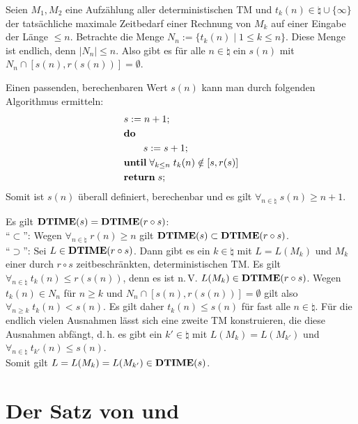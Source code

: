 \begin{Beweis}
    Seien $M_1, M_2$ eine Aufzählung aller deterministischen TM und
    $t_k(n) \in \natural \cup \{\infty\}$ der tatsächliche maximale Zeitbedarf einer Rechnung
    von $M_k$ auf einer Eingabe der Länge $\le n$.
    Betrachte die Menge $N_n := \{t_k(n) \;|\; 1 \le k \le n\}$.
    Diese Menge ist endlich, denn $|N_n| \le n$.
    Also gibt es für alle $n \in \natural$ ein $s(n)$ mit
    $N_n \cap [s(n), r(s(n))] = \emptyset$.

    Einen passenden, berechenbaren Wert $s(n)$ kann man durch folgenden Algorithmus ermitteln:
    \begin{align*}&
        s := n + 1;\\&
        \mathbf{do}\;\\&
        \qquad s := s + 1;\\&
        \mathbf{until}\; \forall_{k \le n}\; t_k(n) \notin [s, r(s)]\\&
        \mathbf{return}\; s;
    \end{align*}
    Somit ist $s(n)$ überall definiert, berechenbar und es gilt
    $\forall_{n \in \natural}\; s(n) \ge n + 1$.

    Es gilt $\mathbf{DTIME}(s) = \mathbf{DTIME}(r \circ s)$:\\
    "`$\subset$"':
    Wegen $\forall_{n \in \natural}\; r(n) \ge n$ gilt $\mathbf{DTIME}(s) \subset \mathbf{DTIME}(r \circ s)$.\\
    "`$\supset$"':
    Sei $L \in \mathbf{DTIME}(r \circ s)$.
    Dann gibt es ein $k \in \natural$ mit $L = L(M_k)$ und $M_k$ einer durch $r \circ s$
    zeitbeschränkten, deterministischen TM.
    Es gilt $\forall_{n \in \natural}\; t_k(n) \le r(s(n))$, denn es ist n.\,V.
    $L(M_k) \in \mathbf{DTIME}(r \circ s)$.
    Wegen $t_k(n) \in N_n$ für $n \ge k$ und $N_n \cap [s(n), r(s(n))] = \emptyset$ gilt
    also $\forall_{n \ge k}\; t_k(n) < s(n)$.
    Es gilt daher $t_k(n) \le s(n)$ für fast alle $n \in \natural$.
    Für die endlich vielen Ausnahmen lässt sich eine zweite TM konstruieren, die diese
    Ausnahmen abfängt, d.\,h. es gibt ein $k' \in \natural$ mit $L(M_k) = L(M_{k'})$ und
    $\forall_{n \in \natural}\; t_{k'}(n) \le s(n)$.\\
    Somit gilt $L = L(M_k) = L(M_{k'}) \in \mathbf{DTIME}(s)$.
\end{Beweis}

\section{%
    Der Satz von  und %
}

